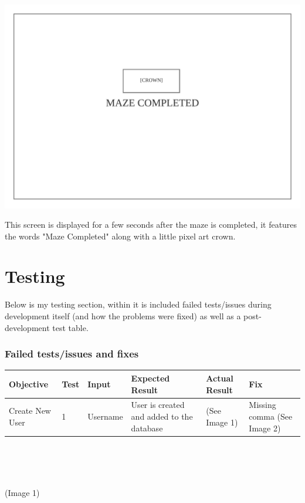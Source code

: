 \documentclass{article}
\begin{document}
\clearpage
\begin{center}
	\includegraphics[scale=0.7]{Maze Completed}

	This screen is displayed for a few seconds after the maze is completed, it features the words "Maze Completed" along with a little pixel art crown.
\end{center}




\clearpage
\part{Testing}
Below is my testing section, within it is included failed tests/issues during development itself (and how the problems were fixed) as well as a post-development test table.
\section{Failed tests/issues and fixes}
\begin{tabular}{|P{3.5cm}|P{0.8cm}|P{3cm}|P{4cm}|P{3cm}|P{3cm}| }
\hline
 \textbf{Objective} & \textbf{Test} & \textbf{Input} & \textbf{Expected Result} & \textbf{Actual Result} & \textbf{Fix} \\
\hline
Create New User & 1 & Username & User is created and added to the database & (See Image 1) & Missing comma (See Image 2) \\
\hline
\end{tabular}
\\
\begin{center}
\\
\vphantom{0}
\\
\color{mygrey}(Image 1)
\end{center}
\end{document}
